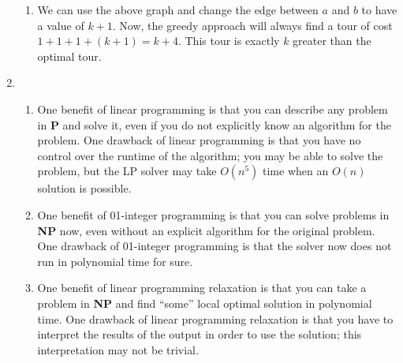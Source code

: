 \documentclass[12pt,letterpaper]{article}
\begin{document}
\begin{enumerate}
\begin{enumerate}
        \item
          We can use the above graph and change the edge between $a$ and $b$ to have a value of $k + 1$.
          Now, the greedy approach will always find a tour of cost $1 + 1 + 1 + (k + 1) = k + 4$.
          This tour is exactly $k$ greater than the optimal tour.
      \end{enumerate}
    \item
      \begin{enumerate}
        \item
          One benefit of linear programming is that
          you can describe any problem in \textbf{P} and solve it,
          even if you do not explicitly know an algorithm for the problem.
          One drawback of linear programming is that
          you have no control over the runtime of the algorithm;
          you may be able to solve the problem,
          but the LP solver may take $O(n^5)$ time when an $O(n)$ solution is possible.
        \item
          One benefit of 01-integer programming is that
          you can solve problems in \textbf{NP} now,
          even without an explicit algorithm for the original problem.
          One drawback of 01-integer programming is that
          the solver now does not run in polynomial time for sure.
        \item
          One benefit of linear programming relaxation is that
          you can take a problem in \textbf{NP} and
          find ``some'' local optimal solution in polynomial time.
          One drawback of linear programming relaxation is that
          you have to interpret the results of the output in order to use the solution;
          this interpretation may not be trivial.
      \end{enumerate}
  \end{enumerate}
\end{document}

